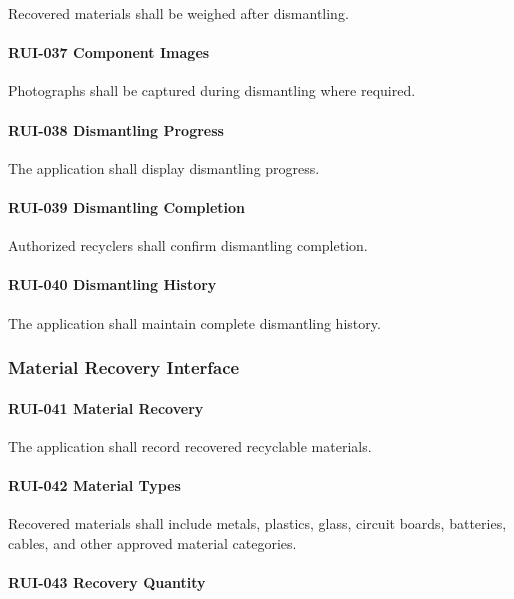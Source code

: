 Recovered materials shall be weighed after dismantling.

\paragraph{RUI-037 Component Images}

Photographs shall be captured during dismantling where required.

\paragraph{RUI-038 Dismantling Progress}

The application shall display dismantling progress.

\paragraph{RUI-039 Dismantling Completion}

Authorized recyclers shall confirm dismantling completion.

\paragraph{RUI-040 Dismantling History}

The application shall maintain complete dismantling history.


\subsubsection*{Material Recovery Interface}

\paragraph{RUI-041 Material Recovery}

The application shall record recovered recyclable materials.

\paragraph{RUI-042 Material Types}

Recovered materials shall include metals, plastics, glass, circuit
boards, batteries, cables, and other approved material categories.

\paragraph{RUI-043 Recovery Quantity}

